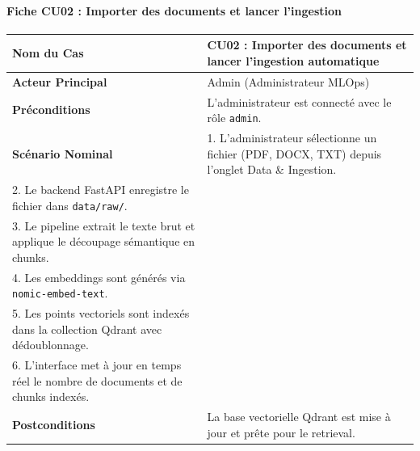 \paragraph{Fiche CU02 : Importer des documents et lancer l'ingestion}
\begin{table}[htbp]
\centering
\small
\begin{tabular}{|p{3.2cm}|p{10.3cm}|}
\hline
\textbf{Nom du Cas} & \textbf{CU02 : Importer des documents et lancer l'ingestion automatique} \\ \hline
\textbf{Acteur Principal} & Admin (Administrateur MLOps) \\ \hline
\textbf{Préconditions} & L'administrateur est connecté avec le rôle \texttt{admin}. \\ \hline
\textbf{Scénario Nominal} & 
1. L'administrateur sélectionne un fichier (PDF, DOCX, TXT) depuis l'onglet Data \& Ingestion.\\
2. Le backend FastAPI enregistre le fichier dans \texttt{data/raw/}.\\
3. Le pipeline extrait le texte brut et applique le découpage sémantique en chunks.\\
4. Les embeddings sont générés via \texttt{nomic-embed-text}.\\
5. Les points vectoriels sont indexés dans la collection Qdrant avec dédoublonnage.\\
6. L'interface met à jour en temps réel le nombre de documents et de chunks indexés. \\ \hline
\textbf{Postconditions} & La base vectorielle Qdrant est mise à jour et prête pour le retrieval. \\ \hline
\end{tabular}
\end{table}

